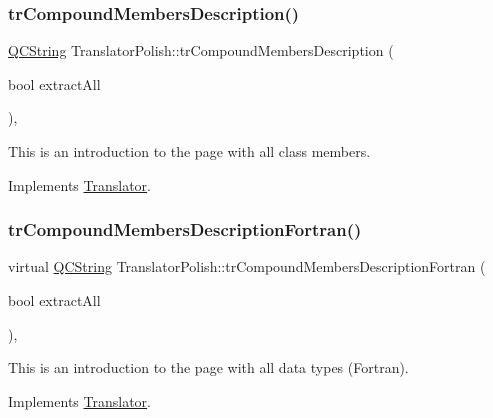 \subsubsection{\texorpdfstring{trCompoundMembersDescription()}{trCompoundMembersDescription()}}
{\footnotesize\ttfamily \mbox{\hyperlink{class_q_c_string}{Q\+C\+String}} Translator\+Polish\+::tr\+Compound\+Members\+Description (\begin{DoxyParamCaption}\item[{bool}]{extract\+All }\end{DoxyParamCaption})\hspace{0.3cm}{\ttfamily [inline]}, {\ttfamily [virtual]}}

This is an introduction to the page with all class members. 

Implements \mbox{\hyperlink{class_translator}{Translator}}.

\mbox{\label{class_translator_polish_a78549d0636c3655e59f8d0c7603cc9ab}} 
\subsubsection{\texorpdfstring{trCompoundMembersDescriptionFortran()}{trCompoundMembersDescriptionFortran()}}
{\footnotesize\ttfamily virtual \mbox{\hyperlink{class_q_c_string}{Q\+C\+String}} Translator\+Polish\+::tr\+Compound\+Members\+Description\+Fortran (\begin{DoxyParamCaption}\item[{bool}]{extract\+All }\end{DoxyParamCaption})\hspace{0.3cm}{\ttfamily [inline]}, {\ttfamily [virtual]}}

This is an introduction to the page with all data types (Fortran). 

Implements \mbox{\hyperlink{class_translator}{Translator}}.

\mbox{\label{class_translator_polish_abe2ff0a54791739a2d2cc55edaf65f8e}} 
